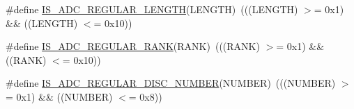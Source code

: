 \begin{DoxyCompactItemize}
\item 
\#define \hyperlink{group___a_d_c__regular__length_ga1ea82167f6dccdef1d160675f4534584}{I\+S\+\_\+\+A\+D\+C\+\_\+\+R\+E\+G\+U\+L\+A\+R\+\_\+\+L\+E\+N\+G\+TH}(L\+E\+N\+G\+TH)~(((L\+E\+N\+G\+TH) $>$= 0x1) \&\& ((\+L\+E\+N\+G\+T\+H) $<$= 0x10))
\item 
\#define \hyperlink{group___a_d_c__regular__rank_ga5928a1e9315f798e27220b91f1bae7f2}{I\+S\+\_\+\+A\+D\+C\+\_\+\+R\+E\+G\+U\+L\+A\+R\+\_\+\+R\+A\+NK}(R\+A\+NK)~(((R\+A\+NK) $>$= 0x1) \&\& ((\+R\+A\+N\+K) $<$= 0x10))
\item 
\#define \hyperlink{group___a_d_c__regular__discontinuous__mode__number_gab8dfaacb2f25e65ca755de71050ff270}{I\+S\+\_\+\+A\+D\+C\+\_\+\+R\+E\+G\+U\+L\+A\+R\+\_\+\+D\+I\+S\+C\+\_\+\+N\+U\+M\+B\+ER}(N\+U\+M\+B\+ER)~(((N\+U\+M\+B\+ER) $>$= 0x1) \&\& ((\+N\+U\+M\+B\+E\+R) $<$= 0x8))
\end{DoxyCompactItemize}
